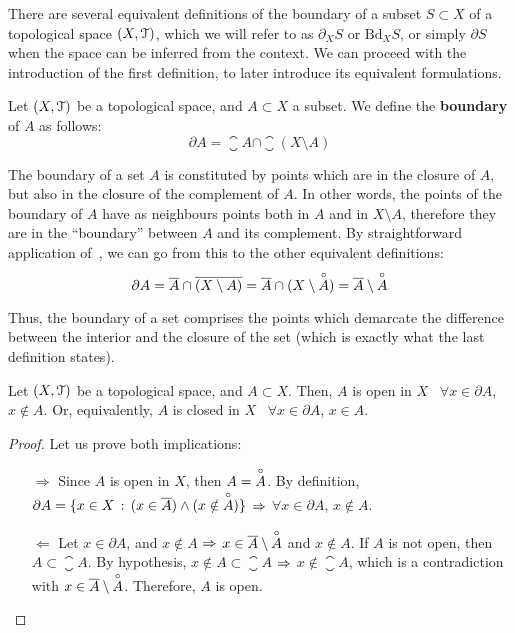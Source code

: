There are several equivalent definitions of the boundary of a subset $S\subset X$ of a topological space $(X,\EuScript{T})$, which we will refer to as $\partial_{X}S$ or $\mathrm{Bd}_{X}S$, or simply $\partial S$ when the space can be inferred from the context. We can proceed with the introduction of the first definition, to later introduce its equivalent formulations.

\begin{definition}
	\label{def:boundary-set}
	Let $(X, \EuScript{T})$ be a topological space, and $A\subset X$ a subset. We define the \textbf{boundary} of $A$ as follows:
	\[
		\partial A = \closure{A}\cap\closure{(X\setminus A)}
	\]
\end{definition}

The boundary of a set $A$ is constituted by points which are in the closure of $A$, but also in the closure of the complement of $A$.
In other words, the points of the boundary of $A$ have as neighbours points both in $A$ and in $X\setminus A$, therefore they are in the ``boundary'' between $A$ and its complement.
By straightforward application of~, we can go from this to the other equivalent definitions:
\[
	\partial A = \overline{A}\cap\overline{(X\setminus A)}=\overline{A}\cap(X\setminus\overset{\circ}{A})=\overline{A}\setminus\overset{\circ}{A}
\]

Thus, the boundary of a set comprises the points which demarcate the difference between the interior and the closure of the set (which is exactly what the last definition states).

\begin{lemma}
	Let $(X,\EuScript{T})$ be a topological space, and $A\subset X$. Then, $A$ is open in $X$ \iff\ $\forall x\in \partial A$, $x\notin A$. Or, equivalently, $A$ is closed in $X$ \iff\ $\forall x\in \partial A$, $x\in A$.
\end{lemma}

\begin{proof}
	Let us prove both implications:
	\begin{itemize}
		\item[$\boxed{\Rightarrow}$] Since $A$ is open in $X$, then $A=\overset{\circ}{A}$. By definition, $\partial A =\{x\in X\,:\,(x\in \overline{A})\land (x\notin \overset{\circ}{A})\}$ $\Rightarrow$ $\forall x\in \partial A$, $x\notin A$.
		\item[$\boxed{\Leftarrow}$] Let $x\in \partial A$, and $x\notin A$ $\Rightarrow$ $x\in \overline{A}\setminus{\overset{\circ}{A}}$ and $x\notin A$. If $A$ is not open, then $A\subset \closure{A}$. By hypothesis, $x\notin A\subset \closure{A}$ $\Rightarrow$ $x\notin \closure{A}$, which is a contradiction with $x\in \overline{A}\setminus{\overset{\circ}{A}}$. Therefore, $A$ is open.
	\end{itemize}
\end{proof}


